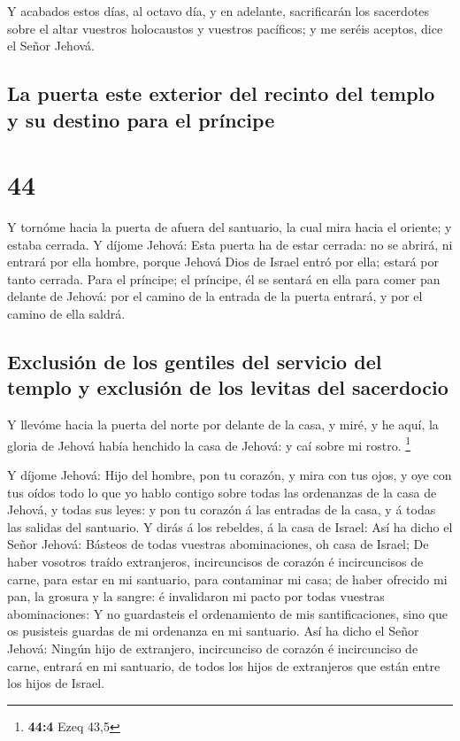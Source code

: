  Y acabados estos días, al octavo día, y en adelante,
sacrificarán los sacerdotes sobre el altar vuestros holocaustos y
vuestros pacíficos; y me seréis aceptos, dice el Señor Jehová.

\hypertarget{la-puerta-este-exterior-del-recinto-del-templo-y-su-destino-para-el-pruxedncipe}{%
\subsection{La puerta este exterior del recinto del templo y su destino
para el
príncipe}\label{la-puerta-este-exterior-del-recinto-del-templo-y-su-destino-para-el-pruxedncipe}}

\hypertarget{section-43}{%
\section{44}\label{section-43}}

 Y tornóme hacia la puerta de afuera del santuario, la cual
mira hacia el oriente; y estaba cerrada.  Y díjome Jehová:
Esta puerta ha de estar cerrada: no se abrirá, ni entrará por ella
hombre, porque Jehová Dios de Israel entró por ella; estará por tanto
cerrada.  Para el príncipe; el príncipe, él se sentará en
ella para comer pan delante de Jehová: por el camino de la entrada de la
puerta entrará, y por el camino de ella saldrá.

\hypertarget{exclusiuxf3n-de-los-gentiles-del-servicio-del-templo-y-exclusiuxf3n-de-los-levitas-del-sacerdocio}{%
\subsection{Exclusión de los gentiles del servicio del templo y
exclusión de los levitas del
sacerdocio}\label{exclusiuxf3n-de-los-gentiles-del-servicio-del-templo-y-exclusiuxf3n-de-los-levitas-del-sacerdocio}}

 Y llevóme hacia la puerta del norte por delante de la casa,
y miré, y he aquí, la gloria de Jehová había henchido la casa de Jehová:
y caí sobre mi rostro. \footnote{\textbf{44:4} Ezeq 43,5}

 Y díjome Jehová: Hijo del hombre, pon tu corazón, y mira
con tus ojos, y oye con tus oídos todo lo que yo hablo contigo sobre
todas las ordenanzas de la casa de Jehová, y todas sus leyes: y pon tu
corazón á las entradas de la casa, y á todas las salidas del santuario.
 Y dirás á los rebeldes, á la casa de Israel: Así ha dicho
el Señor Jehová: Básteos de todas vuestras abominaciones, oh casa de
Israel;  De haber vosotros traído extranjeros, incircuncisos
de corazón é incircuncisos de carne, para estar en mi santuario, para
contaminar mi casa; de haber ofrecido mi pan, la grosura y la sangre: é
invalidaron mi pacto por todas vuestras abominaciones:  Y no
guardasteis el ordenamiento de mis santificaciones, sino que os
pusisteis guardas de mi ordenanza en mi santuario.  Así ha
dicho el Señor Jehová: Ningún hijo de extranjero, incircunciso de
corazón é incircunciso de carne, entrará en mi santuario, de todos los
hijos de extranjeros que están entre los hijos de Israel.

